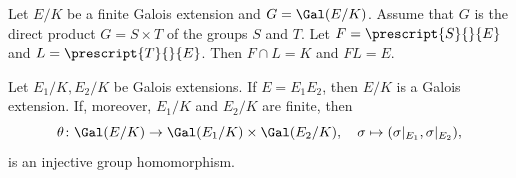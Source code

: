     
    

\begin{exercise}
    Let $E/K$ be a finite Galois extension and $G=\Gal(E/K)$.
    Assume that $G$ is the direct product
    $G=S\times T$
    of the groups $S$ and $T$. Let 
    $F=\prescript{S}{}{E}$ and
    $L=\prescript{T}{}{E}$. Then $F\cap L=K$ and $FL=E$.
\end{exercise}

\begin{proposition}
Let $E_1/K,E_2/K$ be Galois extensions. 
If $E=E_1E_2$, then $E/K$ is a Galois extension. If, moreover, $E_1/K$ and $E_2/K$ are finite,
then 
\[
\theta\colon \Gal(E/K)\to \Gal(E_1/K)\times\Gal(E_2/K),
\quad
\sigma\mapsto(\sigma|_{E_1},\sigma|_{E_2}),
\]
is an injective group homomorphism.
\end{proposition}

